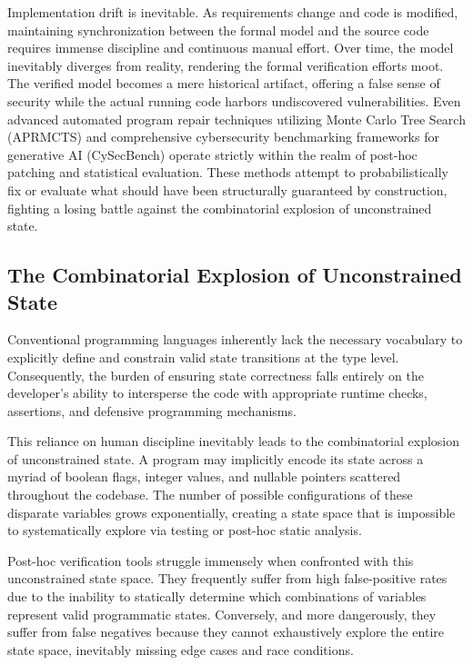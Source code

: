 Implementation drift is inevitable. As requirements change and code is modified, maintaining synchronization between the formal model and the source code requires immense discipline and continuous manual effort. Over time, the model inevitably diverges from reality, rendering the formal verification efforts moot. The verified model becomes a mere historical artifact, offering a false sense of security while the actual running code harbors undiscovered vulnerabilities. Even advanced automated program repair techniques utilizing Monte Carlo Tree Search (APRMCTS) \cite{ref_APRMCTSImprovin18} and comprehensive cybersecurity benchmarking frameworks for generative AI (CySecBench) \cite{ref_CySecBenchGener17} operate strictly within the realm of post-hoc patching and statistical evaluation. These methods attempt to probabilistically fix or evaluate what should have been structurally guaranteed by construction, fighting a losing battle against the combinatorial explosion of unconstrained state.

\subsection{The Combinatorial Explosion of Unconstrained State}

Conventional programming languages inherently lack the necessary vocabulary to explicitly define and constrain valid state transitions at the type level. Consequently, the burden of ensuring state correctness falls entirely on the developer's ability to intersperse the code with appropriate runtime checks, assertions, and defensive programming mechanisms.

This reliance on human discipline inevitably leads to the combinatorial explosion of unconstrained state. A program may implicitly encode its state across a myriad of boolean flags, integer values, and nullable pointers scattered throughout the codebase. The number of possible configurations of these disparate variables grows exponentially, creating a state space that is impossible to systematically explore via testing or post-hoc static analysis.

Post-hoc verification tools struggle immensely when confronted with this unconstrained state space. They frequently suffer from high false-positive rates due to the inability to statically determine which combinations of variables represent valid programmatic states. Conversely, and more dangerously, they suffer from false negatives because they cannot exhaustively explore the entire state space, inevitably missing edge cases and race conditions.

